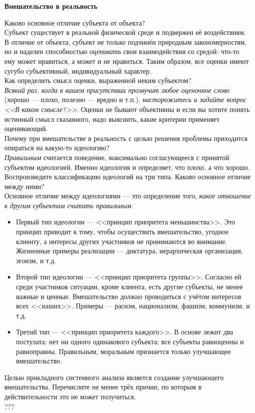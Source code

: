 \documentclass{article}
\newcommand{\note}[1]{\textit{#1}}
\renewcommand{\subsection}[1]{
	\vspace{2em}
	\begin{flushright}
		\large
		\textbf{#1}
	\end{flushright}
	}
\begin{document}
\subsection{Вмешательство в реальность}
Каково основное отличие субъекта от объекта?
\\
Субъект существует в реальной физической среде и подвержен её воздействиям. В отличие от объекта, субъект не только подчинён природным закономерностям, но и наделен способностью \note{оценивать} свои взаимодействия со средой: что-то ему может нравиться, а может и не нравиться. Таким образом, все оценки имеют сугубо субъективный, индивидуальный характер.
\\
Как определить смысл оценки, выраженной неким субъектом?
\\
\note{Всякий раз, когда в вашем присутствии прозвучит любое оценочное слово} (хорошо --- плохо, полезно --- вредно и т.п.), \note{насторожитесь и задайте вопрос <<В каком смысле?>>}. Оценки не бывают объективны и если вы хотите понять истинный смысл сказанного, надо выяснить, какие критерии применяет оценивающий.
\\
Почему при вмешательстве в реальность с целью решения проблемы приходится опираться на какую-то идеологию?
\\
\note{Правильным} считается поведение, максимально согласующееся с принятой субъектом идеологией. Именно идеология и определяет, что плохо, а что хорошо. 
\\
Воспроизведите классификацию идеологий на три типа. Каково основное отличие между ними?
\\
Основное отличие между идеологиями --- это определение того, \note{какое отношение к другим субъектам считать правильным}.
\begin{itemize}
	\item Первый тип идеологии --- <<принцип приоритета меньшинства>>. Это принцип приводит к тому, чтобы осуществить вмешательство, угодное клиенту, а интересы других участников не принимаются во внимание. Жизненные примеры реализации --- диктатура, иерархическая организация, эгоизм, и т.д.
	\item Второй тип идеологии --- <<принцип приоритета группы>>. Согласно ей среди участников ситуации, кроме клиента, есть другие субъекты, не менее важные и ценные. Вмешательство должно проводиться с учётом интересов всех <<наших>>. Примеры --- расизм, национализм, фашизм, коммунизм, и т.д.
	\item Третий тип --- <<принцип приоритета каждого>>. В основе лежит два постулата: нет ни одного одинакового субъекта; все субъекты равноценны и равноправны. Правильным, моральным признается только улучшающее вмешательство.
\end{itemize}
Целью прикладного системного анализа является создание улучшающего вмешательства. Перечислите не менее трёх причин, по которым в действительности это не может получиться.
\\
???
\end{document}
